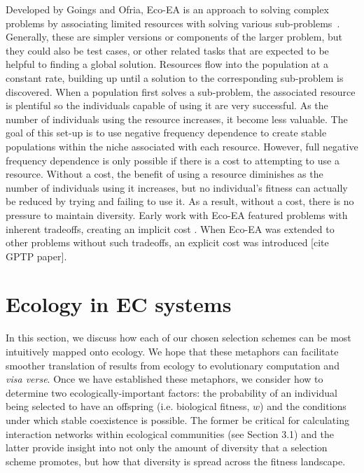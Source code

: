 Developed by Goings and Ofria, Eco-EA is an approach to solving complex problems by associating limited resources with solving various sub-problems~\cite{goings_ecological_2009,goings_natural_2010,goings_ecology-based_2012}. Generally, these are simpler versions or components of the larger problem, but they could also be test cases, or other related tasks that are expected to be helpful to finding a global solution. Resources flow into the population at a constant rate, building up until a solution to the corresponding sub-problem is discovered. When a population first solves a sub-problem, the associated resource is plentiful so the individuals capable of using it are very successful. As the number of individuals using the resource increases, it become less valuable. The goal of this set-up is to use negative frequency dependence to create stable populations within the niche associated with each resource. However, full negative frequency dependence is only possible if there is a cost to attempting to use a resource. Without a cost, the benefit of using a resource diminishes as the number of individuals using it increases, but no individual's fitness can actually be reduced by trying and failing to use it. As a result, without a cost, there is no pressure to maintain diversity. Early work with Eco-EA featured problems with inherent tradeoffs, creating an implicit cost \cite{goings_ecological_2009,goings_ecology-based_2012}. When Eco-EA was extended to other problems without such tradeoffs, an explicit cost was introduced [cite GPTP paper].


\section{Ecology in EC systems}

In this section, we discuss how each of our chosen selection schemes can be most intuitively mapped onto ecology. We hope that these metaphors can facilitate smoother translation of results from ecology to evolutionary computation and \textit{visa verse}. Once we have established these metaphors, we consider how to determine two ecologically-important factors: the probability of an individual being selected to have an offspring (i.e. biological fitness, $w$) and the conditions under which stable coexistence is possible. The former be critical for calculating interaction networks within ecological communities (see Section 3.1) and the latter provide insight into not only the amount of diversity that a selection scheme promotes, but how that diversity is spread across the fitness landscape.

